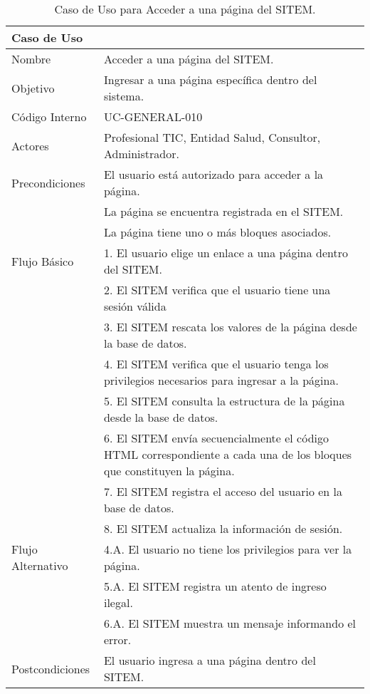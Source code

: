 \begin{table}
\begin{center}
\begin{tabular}{|l|p{10cm}|}
\hline
\textbf{Caso de Uso}&\\
\hline
Nombre & Acceder a una página del SITEM.\\
\hline
Objetivo & Ingresar a una página específica dentro del sistema.\\
\hline
Código Interno & UC-GENERAL-010\\
\hline
Actores & Profesional TIC, Entidad Salud, Consultor, Administrador.\\
\hline
Precondiciones & El usuario está autorizado para acceder a la página.\\
& La página se encuentra registrada en el SITEM.\\
& La página tiene uno o más bloques asociados.\\
\hline
Flujo Básico & 1. El usuario elige un enlace a una página dentro del SITEM.\\
& 2. El SITEM verifica que el usuario tiene una sesión  válida\\
& 3. El SITEM rescata los valores de la página desde la base de datos.\\
& 4. El SITEM verifica que el usuario tenga los privilegios necesarios para ingresar a la página.\\
& 5. El SITEM consulta la estructura de la página desde la base de datos.\\
& 6. El SITEM envía secuencialmente el código HTML correspondiente a cada una de los bloques que constituyen la página.\\
& 7. El SITEM registra el acceso del usuario en la base de datos.\\
& 8. El SITEM actualiza la información de sesión.\\
\hline
Flujo Alternativo & 4.A. El usuario no tiene los privilegios para ver la página. \\
& 5.A. El SITEM registra un atento de ingreso ilegal.\\
& 6.A. El SITEM muestra un mensaje informando el error.\\
\hline
Postcondiciones & El usuario ingresa a una página dentro del SITEM.\\
\hline
\end{tabular}
\caption{Caso de Uso para Acceder a una página del SITEM.}
\label{casouso10} 
\end{center}
\end{table}